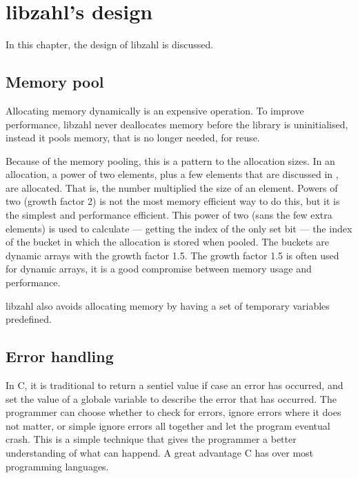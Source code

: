 \chapter{libzahl's design}
\label{chap:libzahl's design}

In this chapter, the design of libzahl is discussed.

\vspace{1cm}
\minitoc


\newpage
\section{Memory pool}
\label{sec:Memory pool}

Allocating memory dynamically is an expensive operation.
To improve performance, libzahl never deallocates memory
before the library is uninitialised, instead it pools
memory, that is no longer needed, for reuse.

Because of the memory pooling, this is a pattern to the
allocation sizes. In an allocation, a power of two
elements, plus a few elements that are discussed in
, are allocated. That is,
the number multiplied the size of an element.
Powers of two (growth factor 2) is not the most memory
efficient way to do this, but it is the simplest and
performance efficient. This power of two (sans the few
extra elements) is used to calculate --- getting the index
of the only set bit --- the index of the bucket in
which the allocation is stored when pooled. The buckets
are dynamic arrays with the growth factor 1.5. The
growth factor 1.5 is often used for dynamic arrays, it
is a good compromise between memory usage and performance.

libzahl also avoids allocating memory by having a set
of temporary variables predefined.


\newpage
\section{Error handling}
\label{sec:Error handling}

In C, it is traditional to return a sentiel value
if case an error has occurred, and set the value
of a globale variable to describe the error that
has occurred. The programmer can choose whether to
check for errors, ignore errors where it does not
matter, or simple ignore errors all together and let
the program eventual crash. This is a simple
technique that gives the programmer a better
understanding of what can happend. A great advantage
C has over most programming languages.

